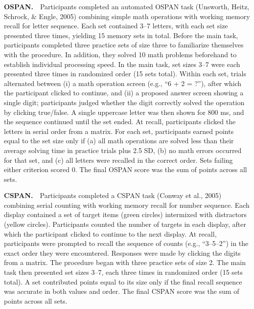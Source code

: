 \documentclass[
  ,man]{apa6}
\begin{document}
\textbf{OSPAN.}\(\quad\)Participants completed an automated OSPAN task (Unsworth, Heitz, Schrock, \& Engle, 2005) combining simple math operations with working memory recall for letter sequence. Each set contained 3--7 letters, with each set size presented three times, yielding 15 memory sets in total. Before the main task, participants completed three practice sets of size three to familiarize themselves with the procedure. In addition, they solved 10 math problems beforehand to establish individual processing speed. In the main task, set sizes 3--7 were each presented three times in randomized order (15 sets total). Within each set, trials alternated between (i) a math operation screen (e.g., ``6 + 2 = ?''), after which the participant clicked to continue, and (ii) a proposed answer screen showing a single digit; participants judged whether the digit correctly solved the operation by clicking true/false. A single uppercase letter was then shown for 800 ms, and the sequence continued until the set ended. At recall, participants clicked the letters in serial order from a matrix. For each set, participants earned points equal to the set size only if (a) all math operations are solved less than their average solving time in practice trials plus 2.5 SD, (b) no math errors occurred for that set, and (c) all letters were recalled in the correct order. Sets failing either criterion scored 0. The final OSPAN score was the sum of points across all sets.

\textbf{CSPAN.}\(\quad\)Participants completed a CSPAN task (Conway et al., 2005) combining serial counting with working memory recall for number sequence. Each display contained a set of target items (green circles) intermixed with distractors (yellow circles). Participants counted the number of targets in each display, after which the participant clicked to continue to the next display. At recall, participants were prompted to recall the sequence of counts (e.g., ``3--5--2'') in the exact order they were encountered. Responses were made by clicking the digits from a matrix. The procedure began with three practice sets of size 2. The main task then presented set sizes 3--7, each three times in randomized order (15 sets total). A set contributed points equal to its size only if the final recall sequence was accurate in both values and order. The final CSPAN score was the sum of points across all sets.
\end{document}
